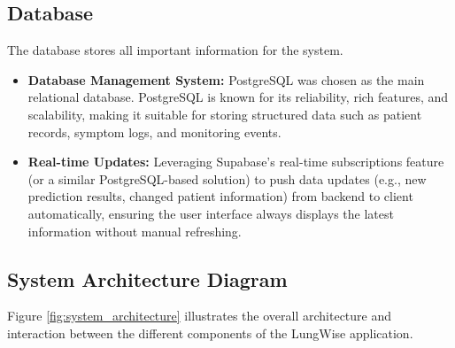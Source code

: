 \subsection{Database}

The database stores all important information for the system.
\begin{itemize}
    \item \textbf{Database Management System:} PostgreSQL was chosen as the main relational database. PostgreSQL is known for its reliability, rich features, and scalability, making it suitable for storing structured data such as patient records, symptom logs, and monitoring events.
    \item \textbf{Real-time Updates:} Leveraging Supabase's real-time subscriptions feature (or a similar PostgreSQL-based solution) to push data updates (e.g., new prediction results, changed patient information) from backend to client automatically, ensuring the user interface always displays the latest information without manual refreshing.
\end{itemize}

\subsection{System Architecture Diagram}

Figure \ref{fig:system_architecture} illustrates the overall architecture and interaction between the different components of the LungWise application.

